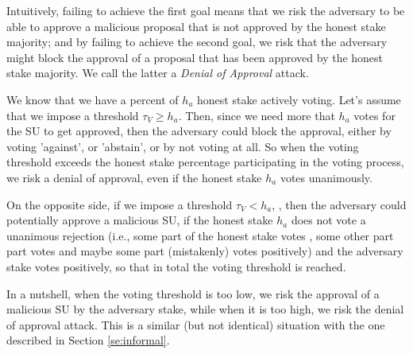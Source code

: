 Intuitively, failing to achieve the first goal means that we risk the adversary to be able to approve a malicious proposal that is not approved by the honest stake majority; and by failing to achieve the second goal, we risk that the adversary might block the approval of a proposal that has been approved by the honest stake majority. We call the latter a \emph{Denial of Approval} attack.

We know that we have a percent of $h_a$ honest stake actively voting. Let's assume that we impose a threshold $\tau_V \geq h_a$.
 Then, since we need more that $h_a$ votes for the SU to get approved, then the adversary could block the approval, either by voting 'against', or 'abstain', or by not voting at all. So when the voting threshold exceeds the honest stake percentage participating in the voting process, we risk a denial of approval, even if the honest stake $h_a$ votes unanimously.
 
On the opposite side, if we impose a threshold $\tau_V < h_a$,  
, then the adversary could potentially approve a malicious SU, if the honest stake $h_a$ does not vote a unanimous rejection (i.e., some part of the honest stake votes , some other part part votes  and maybe some part (mistakenly) votes positively) and the adversary stake votes positively, so that in total the voting threshold is reached. 

In a nutshell, when the voting threshold is too low, we risk the approval of a malicious SU by the adversary stake, while when it is too high, we risk the denial of approval attack. This is a similar (but not identical) situation with the one described in Section \ref{se:informal}.

